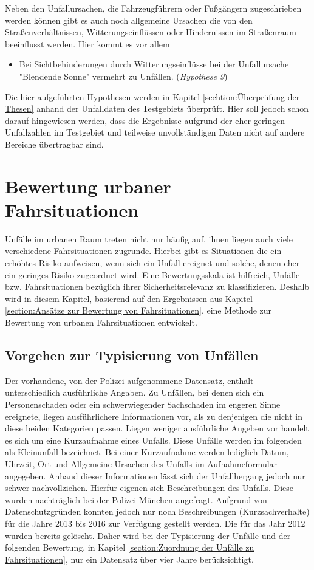 Neben den Unfallursachen, die Fahrzeugführern oder Fußgängern zugeschrieben werden können gibt es auch noch allgemeine Ursachen die von den Straßenverhältnissen, Witterungseinflüssen oder Hindernissen im Straßenraum beeinflusst werden. Hier kommt es vor allem 

\begin{itemize}	
	\item Bei Sichtbehinderungen durch Witterungseinflüsse bei der Unfallursache "Blendende Sonne" vermehrt zu Unfällen. (\textit{Hypothese 9})
\end{itemize}

Die hier aufgeführten Hypothesen werden in Kapitel \ref{sechtion:Überprüfung der Thesen} anhand der Unfalldaten des Testgebiets überprüft. Hier soll jedoch schon darauf hingewiesen werden, dass die Ergebnisse aufgrund der eher geringen Unfallzahlen im Testgebiet und teilweise unvollständigen Daten nicht auf andere Bereiche übertragbar sind. %


\section{Bewertung urbaner Fahrsituationen}
Unfälle im urbanen Raum treten nicht nur häufig auf, ihnen liegen auch viele verschiedene Fahrsituationen zugrunde. Hierbei gibt es Situationen die ein erhöhtes Risiko aufweisen, wenn sich ein Unfall ereignet und solche, denen eher ein geringes Risiko zugeordnet wird. Eine Bewertungsskala ist hilfreich, Unfälle bzw. Fahrsituationen bezüglich ihrer Sicherheitsrelevanz zu klassifizieren. Deshalb wird in diesem Kapitel, basierend auf den Ergebnissen aus Kapitel \ref{section:Ansätze zur Bewertung von Fahrsituationen}, eine Methode zur Bewertung von urbanen Fahrsituationen entwickelt.

\subsection{Vorgehen zur Typisierung von Unfällen} 
Der vorhandene, von der Polizei aufgenommene Datensatz, enthält unterschiedlich ausführliche Angaben. Zu Unfällen, bei denen sich ein Personenschaden oder ein schwerwiegender Sachschaden im engeren Sinne ereignete, liegen ausführlichere Informationen vor, als zu denjenigen die nicht in diese beiden Kategorien passen. Liegen weniger ausführliche Angeben vor handelt es sich um eine Kurzaufnahme eines Unfalls. Diese Unfälle werden im folgenden als Kleinunfall bezeichnet. Bei einer Kurzaufnahme werden lediglich Datum, Uhrzeit, Ort und Allgemeine Ursachen des Unfalls im Aufnahmeformular angegeben. Anhand dieser Informationen lässt sich der Unfallhergang jedoch nur schwer nachvollziehen. Hierfür eigenen sich Beschreibungen des Unfalls. Diese wurden nachträglich bei der Polizei München angefragt. Aufgrund von Datenschutzgründen konnten jedoch nur noch Beschreibungen (Kurzsachverhalte) für die Jahre 2013 bis 2016 zur Verfügung gestellt werden. Die für das Jahr 2012 wurden bereits gelöscht. Daher wird bei der Typisierung der Unfälle und der folgenden Bewertung, in Kapitel \ref{section:Zuordnung der Unfälle zu Fahrsituationen}, nur ein Datensatz über vier Jahre berücksichtigt.


